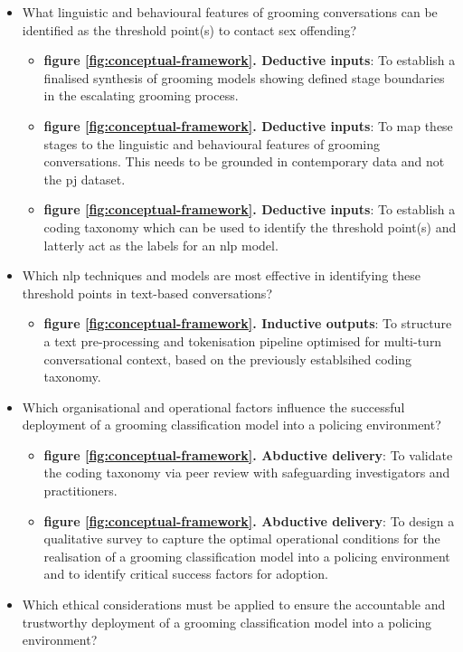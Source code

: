 \documentclass[12pt,a4paper,oneside]{report}
\begin{document}
\begin{itemize}
    \item What linguistic and behavioural features of grooming conversations can be identified as the threshold point(s) to contact sex offending?
    \begin{itemize}
        \item \textbf{figure \ref{fig:conceptual-framework}. Deductive inputs}: To establish a finalised synthesis of grooming models showing defined stage boundaries in the escalating grooming process.
        \item \textbf{figure \ref{fig:conceptual-framework}. Deductive inputs}: To map these stages to the linguistic and behavioural features of grooming conversations.  This needs to be grounded in contemporary data and not the \gls{pj} dataset.
        \item \textbf{figure \ref{fig:conceptual-framework}. Deductive inputs}: To establish a coding taxonomy which can be used to identify the threshold point(s) and latterly act as the labels for an \gls{nlp} model.
    \end{itemize}
    \item Which \gls{nlp} techniques and models are most effective in identifying these threshold points in text-based conversations?
    \begin{itemize}
        \item \textbf{figure \ref{fig:conceptual-framework}. Inductive outputs}: To structure a text pre-processing and tokenisation pipeline optimised for multi-turn conversational context, based on the previously establsihed coding taxonomy.
    \end{itemize}
    \item Which organisational and operational factors influence the successful deployment of a grooming classification model into a policing environment?
    \begin{itemize}
        \item \textbf{figure \ref{fig:conceptual-framework}. Abductive delivery}: To validate the coding taxonomy via peer review with safeguarding investigators and practitioners.
        \item \textbf{figure \ref{fig:conceptual-framework}. Abductive delivery}: To design a qualitative survey to capture the optimal operational conditions for the realisation of a grooming classification model into a policing environment and to identify critical success factors for adoption.
    \end{itemize}
    \item Which ethical considerations must be applied to ensure the accountable and trustworthy deployment of a grooming classification model into a policing environment?

\end{itemize}
\end{document}
